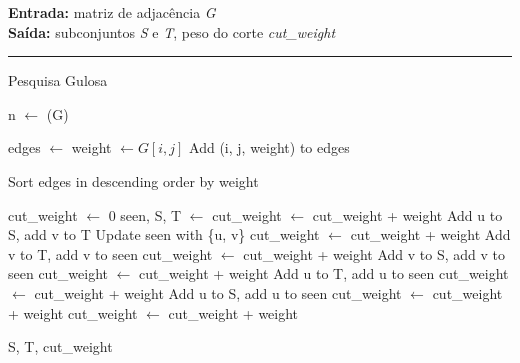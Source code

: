 \documentclass[mirror]{revdetua}
\begin{document}
\begin{algorithm}[H]
    \raggedright
    \textbf{Entrada:} matriz de adjacência \textit{G} \\
    \textbf{Saída:} subconjuntos \textit{S} e \textit{T}, peso do corte \textit{cut\_weight} \\
    \hrule 
    \caption{Pesquisa Gulosa}
    \begin{algorithmic}[1]
    
        \State n $\gets$ (G)

        \State edges $\gets$ 
                \State weight $\gets G[i, j]$
                \State Add (i, j, weight) to edges
            \EndFor
        \EndFor

        \State Sort edges in descending order by weight

        \State cut\_weight $\gets$ 0
        \State seen, S, T $\gets$ 
                \State cut\_weight $\gets$ cut\_weight + weight
                \State Add u to S, add v to T
                \State Update seen with \{u, v\}
                \State cut\_weight $\gets$ cut\_weight + weight
                \State Add v to T, add v to seen
                \State cut\_weight $\gets$ cut\_weight + weight
                \State Add v to S, add v to seen
                \State cut\_weight $\gets$ cut\_weight + weight
                \State Add u to T, add u to seen
                \State cut\_weight $\gets$ cut\_weight + weight
                \State Add u to S, add u to seen
                \State cut\_weight $\gets$ cut\_weight + weight
            \State cut\_weight $\gets$ cut\_weight + weight
            \Else
            \EndIf
        \EndFor

        \State \Return S, T, cut\_weight
    
    \end{algorithmic}
\end{algorithm}

\end{document}
